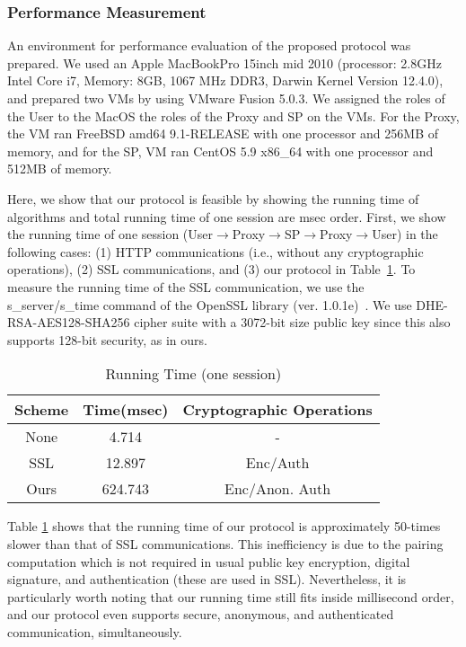 \documentclass[preprint]{sig-alternate}
\begin{document}
\subsubsection{Performance Measurement}

An environment for performance evaluation of the proposed protocol was prepared.
We used an Apple MacBookPro 15inch mid 2010 (processor: 2.8GHz Intel Core i7, Memory: 8GB, 1067 MHz DDR3, Darwin Kernel Version 12.4.0), and prepared two VMs by using VMware Fusion 5.0.3. 
We assigned the roles of the User to the MacOS the roles of the Proxy and SP on the VMs. For the Proxy, the VM ran FreeBSD amd64 9.1-RELEASE with one processor and 256MB of memory, and for the SP, VM ran CentOS 5.9 x86\_64 with one processor and 512MB of memory. 


Here, we show that our protocol is feasible by showing the running time of algorithms and total running time of one session are msec order.
First, we show the running time of one session (User$\rightarrow$Proxy$\rightarrow$SP$\rightarrow$Proxy$\rightarrow$User) in the following cases: (1) HTTP communications (i.e., without any cryptographic operations), (2) SSL communications, and (3) our protocol in Table~\ref{session-time}.
To measure the running time of the SSL communication, we use the s\_server/s\_time command of the OpenSSL library (ver. 1.0.1e)~\cite{openssl}.
We use DHE-RSA-AES128-SHA256 cipher suite with a 3072-bit size public key since this also supports 128-bit security, as in ours.

\begin{table}[h]
\centering
\caption{Running Time (one session)}\label{session-time}
\begin{tabular}{|c|c|c|} 
\hline
Scheme & Time(msec) & Cryptographic Operations\\ \hline\hline
None & 4.714  & - \\ \hline
SSL & 12.897  & Enc/Auth\\ \hline
Ours & 624.743 & Enc/Anon. Auth\\\hline
\end{tabular}
\end{table}


\noindent 
Table \ref{session-time} shows that the running time of our protocol is approximately 50-times slower than that of SSL communications. 
This inefficiency is due to the pairing computation which is not required in usual public key encryption, digital signature, and authentication (these are used in SSL). 
Nevertheless, 
it is particularly worth noting that our running time still fits inside millisecond order, 
and our protocol even supports secure, anonymous, and authenticated communication, simultaneously. 
\end{document}

